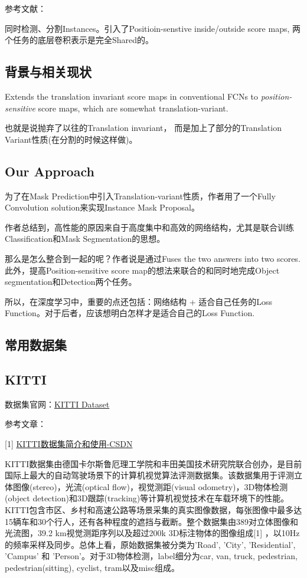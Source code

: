 参考文献：\cite{li2016fully}

同时检测、分割Instances。引入了Positioin-senstive inside/outside score maps, 两个任务的底层卷积表示是完全Shared的。

\subsection{背景与相关现状}

Extends the translation invariant score maps in conventional FCNs to \textit{position-sensitive} score maps, which are somewhat translation-variant.

也就是说抛弃了以往的Translation invariant， 而是加上了部分的Translation Variant性质(在分割的时候这样做)。

\subsection{Our Approach}

为了在Mask Prediction中引入Translation-variant性质，作者用了一个Fully Convolution solution来实现Instance Mask Proposal。

作者总结到，高性能的原因来自于高度集中和高效的网络结构，尤其是联合训练Classification和Mask Segmentation的思想。

那么是怎么整合到一起的呢？作者说是通过Fuses the two answers into two scores. 此外，提高Position-sensitive score map的想法来联合的和同时地完成Object segmentation和Detection两个任务。

所以，在深度学习中，重要的点还包括：网络结构 + 适合自己任务的Loss Function。对于后者，应该想明白怎样才是适合自己的Loss Function.

\subsection{常用数据集}

\subsection{KITTI}

数据集官网：\href{http://www.cvlibs.net/datasets/kitti/index.php}{KITTI Dataset}

参考文章：

[1] \href{https://blog.csdn.net/Solomon1558/article/details/70173223}{KITTI数据集简介和使用-CSDN}

KITTI数据集由德国卡尔斯鲁厄理工学院和丰田美国技术研究院联合创办，是目前国际上最大的自动驾驶场景下的计算机视觉算法评测数据集。该数据集用于评测立体图像(stereo)，光流(optical flow)，视觉测距(visual odometry)，3D物体检测(object detection)和3D跟踪(tracking)等计算机视觉技术在车载环境下的性能。KITTI包含市区、乡村和高速公路等场景采集的真实图像数据，每张图像中最多达15辆车和30个行人，还有各种程度的遮挡与截断。整个数据集由389对立体图像和光流图，39.2 km视觉测距序列以及超过200k 3D标注物体的图像组成[1] ，以10Hz的频率采样及同步。总体上看，原始数据集被分类为’Road’, ’City’, ’Residential’, ’Campus’ 和 ’Person’。对于3D物体检测，label细分为car, van, truck, pedestrian, pedestrian(sitting), cyclist, tram以及misc组成。

